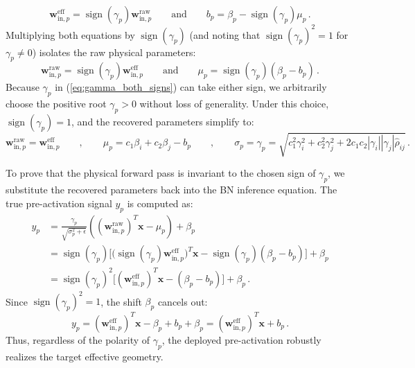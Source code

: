 \documentclass[11pt, a4paper, copyright, gdm]{google}
\newcommand{\wVect}{\boldsymbol{w}}
\newcommand{\xVect}{\boldsymbol{x}}
\DeclareMathOperator{\sign}{sign}
\theoremstyle{definition}
\begin{document}
\begin{equation}
\wVect_{\text{in},p}^{\text{eff}} = \sign(\gamma_p) \wVect_{\text{in},p}^{\text{raw}} \qquad \text{and} \qquad b_p = \beta_p - \sign(\gamma_p) \mu_p \,.
\end{equation}
Multiplying both equations by $\sign(\gamma_p)$ (and noting that $\sign(\gamma_p)^2 = 1$ for $\gamma_p \neq 0$) isolates the raw physical parameters:
\begin{equation}
\wVect_{\text{in},p}^{\text{raw}} = \sign(\gamma_p) \wVect_{\text{in},p}^{\text{eff}} \qquad \text{and} \qquad \mu_p = \sign(\gamma_p)(\beta_p - b_p) \,.
\end{equation}
Because $\gamma_p$ in (\ref{eq:gamma_both_signs}) can take either sign, we arbitrarily choose the positive root $\gamma_p > 0$ without loss of generality. Under this choice, $\sign(\gamma_p) = 1$, and the recovered parameters simplify to:
\begin{equation}
\wVect_{\text{in},p}^{\text{raw}} =  \wVect_{\text{in},p}^{\text{eff}} \qquad , \qquad \mu_p = c_1 \beta_i + c_2 \beta_j - b_p \qquad,\qquad \sigma_p = \gamma_p = \sqrt{c_1^2 \gamma_i^2 + c_2^2 \gamma_j^2 + 2 c_1 c_2 |\gamma_i| |\gamma_j| \hat{\rho}_{ij}} \,.
\end{equation}

To prove that the physical forward pass is invariant to the chosen sign of $\gamma_p$, we substitute the recovered parameters back into the BN inference equation. The true pre-activation signal $y_p$ is computed as:
\begin{align}
y_p &= \frac{\gamma_p}{\sqrt{\sigma_p^2 + \epsilon}} \left( (\wVect_{\text{in},p}^{\text{raw}})^T \xVect - \mu_p \right) + \beta_p \nonumber \\
    &= \sign(\gamma_p) \Big[ \big(\sign(\gamma_p)\wVect_{\text{in},p}^{\text{eff}}\big)^T \xVect - \sign(\gamma_p)(\beta_p - b_p) \Big] + \beta_p \nonumber \\
    &= \sign(\gamma_p)^2 \Big[ (\wVect_{\text{in},p}^{\text{eff}})^T \xVect - (\beta_p - b_p) \Big] + \beta_p \,.
\end{align}
Since $\sign(\gamma_p)^2 = 1$, the shift $\beta_p$ cancels out:
\begin{equation}
y_p = (\wVect_{\text{in},p}^{\text{eff}})^T \xVect - \beta_p + b_p + \beta_p = (\wVect_{\text{in},p}^{\text{eff}})^T \xVect + b_p \,.
\end{equation}
Thus, regardless of the polarity of $\gamma_p$, the deployed pre-activation robustly realizes the target effective geometry.
\end{document}
